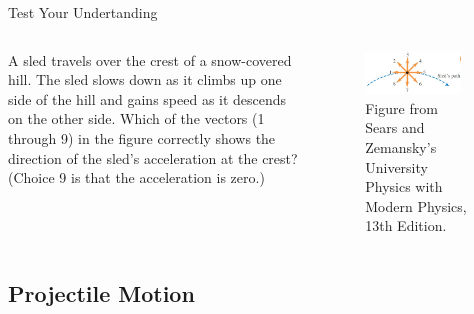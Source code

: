 \documentclass[]{beamer}
\begin{document}



\begin{frame}
    Test Your Undertanding
    \vspace{3mm}


      \begin{columns}[c]
          \column{2in}  %
         
          A sled travels over
          the crest of a snow-covered hill. The
          sled slows down as it climbs up one
          side of the hill and gains speed as it
          descends on the other side. Which of
          the vectors (1 through 9) in the figure
          correctly shows the direction of the
          sled’s acceleration at the crest? (Choice 9 is that the acceleration is zero.)
      
  
  
          \column{2.5in}
          
          \begin{figure}[h!]  
         \includegraphics[width=0.9\textwidth]{images/17.jpg}
          \caption{ {\tiny Figure from Sears and Zemansky's University Physics 
          with Modern Physics, 13th Edition.} }
       \end{figure}
       
       
       
          \end{columns}

          


\end{frame}



\subsection{Projectile Motion}
\end{document}

